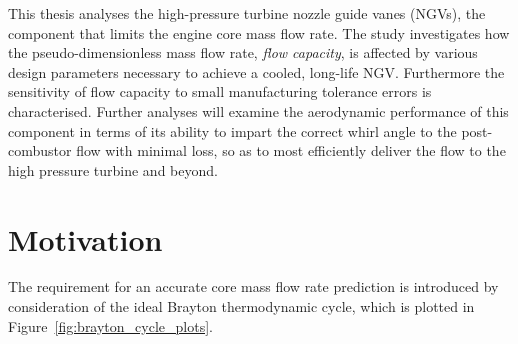 \documentclass[a4paper, 11pt, oneside]{report}
\begin{document}
This thesis analyses the high-pressure turbine nozzle guide vanes (NGVs), the component that limits the engine core mass flow rate. The study investigates how the pseudo-dimensionless mass flow rate, \textit{flow capacity}, is affected by various design parameters necessary to achieve a cooled, long-life NGV. Furthermore the sensitivity of flow capacity to small manufacturing tolerance errors is characterised. Further analyses will examine the aerodynamic performance of this component in terms of its ability to impart the correct whirl angle to the post-combustor flow with minimal loss, so as to most efficiently deliver the flow to the high pressure turbine and beyond.



\newpage
\section{Motivation}

The requirement for an accurate core mass flow rate prediction is introduced by consideration of the ideal Brayton thermodynamic cycle, which is plotted in Figure~\ref{fig:brayton_cycle_plots}.
\end{document}
